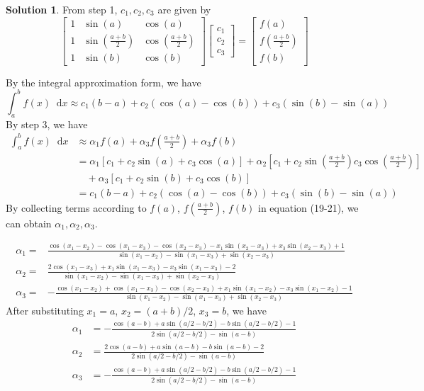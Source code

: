 \documentclass{article}
\newcommand*\diff{\mathop{}\!\mathrm{d}}
\theoremstyle{definition}
\newtheorem{solution}{Solution}
\begin{document}
\begin{solution}
	From step 1, $c_1,c_2,c_3$ are given by
	\begin{equation}
		\begin{bmatrix}
			1& \sin(a)& \cos(a)\\
			1& \sin(\frac{a+b}{2})& \cos(\frac{a+b}{2})\\
			1& \sin(b)& \cos(b)
		\end{bmatrix}\begin{bmatrix}
			c_1\\
			c_2\\
			c_3
		\end{bmatrix}=\begin{bmatrix}
			f(a)\\
			f(\frac{a+b}{2})\\
			f(b)
		\end{bmatrix}
	\end{equation}

	By the integral approximation form, we have
	\begin{equation}
		\int_{a}^{b}f(x)\diff x\approx c_1(b-a)+c_2(\cos(a)-\cos(b))+c_3(\sin(b)-\sin(a))
	\end{equation}
	By step 3, we have
	\begin{align}
	\int_{a}^{b}f(x)\diff x&\approx\alpha_1 f(a)+\alpha_3f(\frac{a+b}{2})+\alpha_3f(b)\\
	&=\alpha_1\left[c_1+c_2\sin(a)+c_3\cos(a)\right]+\alpha_2\left[c_1+c_2\sin(\frac{a+b}{2})c_3\cos(\frac{a+b}{2})\right]\\
	&\quad +\alpha_3\left[c_1+c_2\sin(b)+c_3\cos(b)\right]\\
	&=c_1(b-a)+c_2(\cos(a)-\cos(b))+c_3(\sin(b)-\sin(a))
	\end{align}
	By collecting terms according to $f(a)$, $f\left(\frac{a+b}{2}\right)$, $f(b)$ in equation (19-21), we can obtain $\alpha_1,\alpha_2,\alpha_3$.

	\begin{align*}
		\alpha_1=&\frac{\cos(x_1 - x_2) - \cos(x_1 - x_3) - \cos(x_2 - x_3) - x_1\sin(x_2 - x_3) + x_3\sin(x_2 - x_3) + 1}{\sin(x_1 - x_2) - \sin(x_1 - x_3) + \sin(x_2 - x_3)}\\
		\alpha_2=&\frac{2\cos(x_1 - x_3) + x_1\sin(x_1 - x_3) - x_3\sin(x_1 - x_3) - 2}{\sin(x_1 - x_2) - \sin(x_1 - x_3) + \sin(x_2 - x_3)}\\
		\alpha_3=&-\frac{\cos(x_1 - x_2) + \cos(x_1 - x_3) - \cos(x_2 - x_3) + x_1\sin(x_1 - x_2) - x_3\sin(x_1 - x_2) - 1}{\sin(x_1 - x_2) - \sin(x_1 - x_3) + \sin(x_2 - x_3)}
	\end{align*}
	After substituting $x_1=a$, $x_2=(a+b)/2$, $x_3=b$, we have
	\begin{align*}
	\alpha_1 &= -\frac{\cos(a - b) + a\sin(a/2 - b/2) - b\sin(a/2 - b/2) - 1}{2\sin(a/2 - b/2) - \sin(a - b)}\\
	\alpha_2 &= \frac{2\cos(a - b) + a\sin(a - b) - b\sin(a - b) - 2}{2\sin(a/2 - b/2) - \sin(a - b)}\\
	\alpha_3 &= -\frac{\cos(a - b) + a\sin(a/2 - b/2) - b\sin(a/2 - b/2) - 1}{2\sin(a/2 - b/2) - \sin(a - b)}
	\end{align*}
	

\end{solution}
\end{document}
